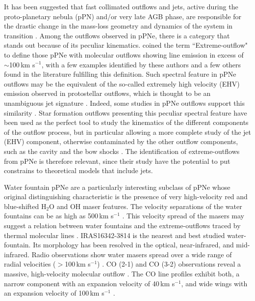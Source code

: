 \documentclass[a4paper,fleqn,usenatbib]{mnras}
\begin{document}
It has been suggested that fast collimated outflows and jets, active during the proto-planetary nebula (pPN) and/or very late AGB phase, are responsible for the drastic change in the mass-loss geometry and dynamics of the system in transition \citep{Sahai98}. Among the outflows observed in pPNe, there is a category that stands out because of its peculiar kinematics. \citet{Sahai15} coined the term ``Extreme-outflow" to define those pPNe with molecular outflows showing line emission in excess of $\sim$100\,km s$^{-1}$, with a few examples identified by these authors and a few others found in the literature fulfilling this definition. Such spectral feature in pPNe outflows may be the equivalent of the so-called extremely high velocity (EHV) emission observed in protostellar outflows, which is thought to be an unambiguous jet signature \citep{Bachiller96}. Indeed, some studies in pPNe outflows support this similarity \citep[see, e.g.,][]{Balick13}. Star formation outflows presenting this peculiar spectral feature have been used as the perfect tool to study the kinematics of the different components of the outflow process, but in particular allowing a more complete study of the jet (EHV) component, otherwise contaminated by the other outflow components, such as the cavity and the bow shocks \citep[see, e.g.,][]{Lefloch15}. The identification of extreme-outflows from pPNe is therefore relevant, since their study have the potential to put constrains to theoretical models that include jets. 

Water fountain pPNe are a particularly interesting subclass of pPNe whose original distinguishing characteristic is the presence of very high-velocity red and blue-shifted H$_2$O and OH maser features. The velocity separations of the water fountains can be as high as 500\,km s$^{-1}$ \citep{Gomez11}. This velocity spread of the masers may suggest a relation between water fountains and the extreme-outflows traced by thermal molecular lines \citep{Yung16}. IRAS16342-3814 is the nearest \citep[$\sim$2 kpc;][]{Sahai99} and best studied water-fountain. Its morphology has been resolved in the optical, near-infrared, and mid-infrared. Radio observations show water masers spread over a wide range of radial velocities ($>$100\,km s$^{-1}$) \citep{Chong15}. CO (2-1) and CO (3-2) observations reveal a massive, high-velocity molecular outflow \citep{He08,Imai09,Imai12}. The CO line profiles exhibit both, a narrow component with an expansion velocity of 40\,km s$^{-1}$, and wide wings with an expansion velocity of 100\,km s$^{-1}$ \citep{Imai12}.
\end{document}
